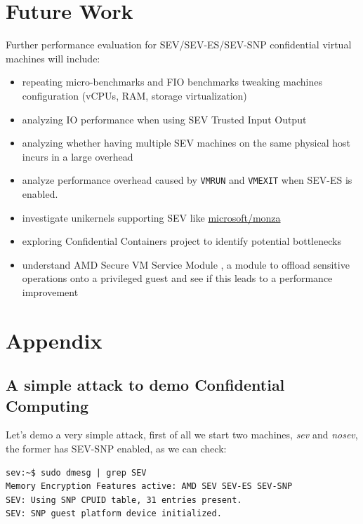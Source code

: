 \documentclass[twocolumn]{article}
\begin{document}
\section{Future Work}
Further performance evaluation for SEV/SEV-ES/SEV-SNP confidential virtual machines will include:

\begin{itemize}
    \item repeating micro-benchmarks and FIO benchmarks tweaking machines configuration (vCPUs, RAM, storage virtualization)
    \item analyzing IO performance when using SEV Trusted Input Output \cite{tio}
    \item analyzing whether having multiple SEV machines on the same physical host incurs in a large overhead
    \item analyze performance overhead caused by \texttt{VMRUN} and \texttt{VMEXIT} when SEV-ES is enabled.
    \item investigate unikernels supporting SEV like \href{https://github.com/microsoft/monza}{microsoft/monza}
    \item exploring Confidential Containers \cite{coco} project to identify potential bottlenecks
    \item understand AMD Secure VM Service Module \cite{svsm}, a module to offload sensitive operations onto a privileged guest and see if this leads to a performance improvement
\end{itemize}

    
\printbibliography
\appendix

\section{Appendix}
\subsection{A simple attack to demo Confidential Computing}
Let's demo a very simple attack, first of all we start two machines, \textit{sev} and \textit{nosev}, the former has SEV-SNP enabled, as we can check:

\begin{verbatim}
sev:~$ sudo dmesg | grep SEV
Memory Encryption Features active: AMD SEV SEV-ES SEV-SNP
SEV: Using SNP CPUID table, 31 entries present.
SEV: SNP guest platform device initialized.
\end{verbatim}
\end{document}
